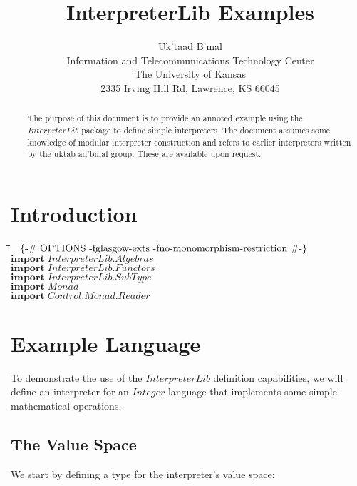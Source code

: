 \documentclass[10pt]{article}
\title{InterpreterLib Examples}
\author{Uk'taad B'mal \\
  Information and Telecommunications Technology Center \\
  The University of Kansas \\
  2335 Irving Hill Rd, Lawrence, KS 66045}
\newlength{\lwidth}\setlength{\lwidth}{4.5cm}
\newlength{\cwidth}\setlength{\cwidth}{8mm} %
\newcommand{\Conid}[1]{\mathit{#1}}
\begin{document}
\maketitle

\begin{abstract}
  The purpose of this document is to provide an annoted example using
  the \ensuremath{\Conid{InterprterLib}} package to define simple interpreters.  The
  document assumes some knowledge of modular interpreter construction
  and refers to earlier interpreters written by the uktab ad'bmal
  group.  These are available upon request.
\end{abstract}

\section{Introduction}

\begin{tabbing}
\qquad\=\hspace{\lwidth}\=\hspace{\cwidth}\=\+\kill
${\mbox{\enskip\{-\# OPTIONS -fglasgow-exts -fno-monomorphism-restriction  \#-\}\enskip}}$\\
${\mathbf{import}\;\Conid{\Conid{InterpreterLib}.Algebras}}$\\
${\mathbf{import}\;\Conid{\Conid{InterpreterLib}.Functors}}$\\
${\mathbf{import}\;\Conid{\Conid{InterpreterLib}.SubType}}$\\
${\mathbf{import}\;\Conid{Monad}}$\\
${\mathbf{import}\;\Conid{\Conid{Control}.\Conid{Monad}.Reader}}$
\end{tabbing}
\section{Example Language}

To demonstrate the use of the \ensuremath{\Conid{InterpreterLib}} definition
capabilities, we will define an interpreter for an \ensuremath{\Conid{Integer}} language
that implements some simple mathematical operations.

\subsection{The Value Space}

We start by defining a type for the interpreter's value space:
\end{document}

